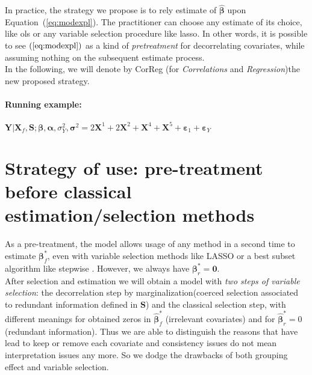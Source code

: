 \documentclass[12pt,a4paper]{report}
\begin{document}
In practice, the strategy we propose is to rely estimate of  $\hat{\boldsymbol{\beta}}$ upon Equation~(\ref{eq:modexpl}). The practitioner can choose any estimate of its choice, like {\sc ols} or any variable selection procedure like {\sc lasso}. In other words, it is possible to see $(\ref{eq:modexpl})$ as a kind of {\it pretreatment} for decorrelating covariates, while assuming nothing on the subsequent estimate process.\\

In the following, we will denote by {\sc CorReg} (for {\it Correlations} and {\it Regression})the new proposed strategy.

\paragraph{Running example:} $\boldsymbol{Y}|\boldsymbol{X}_f,\boldsymbol{S};\boldsymbol{\beta},\boldsymbol{\alpha},\sigma_Y^2,\boldsymbol{\sigma}^2= 2\boldsymbol{X}^1+2\boldsymbol{X}^2+\boldsymbol{X}^4+\boldsymbol{X}^5+\boldsymbol{\varepsilon}_1 +\boldsymbol{\varepsilon}_Y$



\section{Strategy of use: pre-treatment before classical estimation/selection methods}\label{interpretation}

As a pre-treatment, the model allows usage of any method in a second time to estimate $\boldsymbol{\beta}_{f}^*$, even with variable selection methods like LASSO or a best subset algorithm like stepwise \cite{seber2012linear}. However, we always have $\boldsymbol{\beta}^*_r=\boldsymbol{0}$.\\

After selection and estimation we will obtain a model with { \it two steps of variable selection}: the decorrelation step by marginalization(coerced selection associated to redundant information defined in $\boldsymbol{S}$) and the classical selection step, with different meanings for obtained zeros in $\hat{\boldsymbol{\beta}}^*_{f}$ (irrelevant covariates) and for $\hat{\boldsymbol{\beta}}^*_{r}=0$ (redundant information). 
 Thus we are able to distinguish the reasons that have lead to keep or remove each covariate and consistency issues do not mean interpretation issues any more. So we dodge the drawbacks of both grouping effect and variable selection.\\
\end{document}
